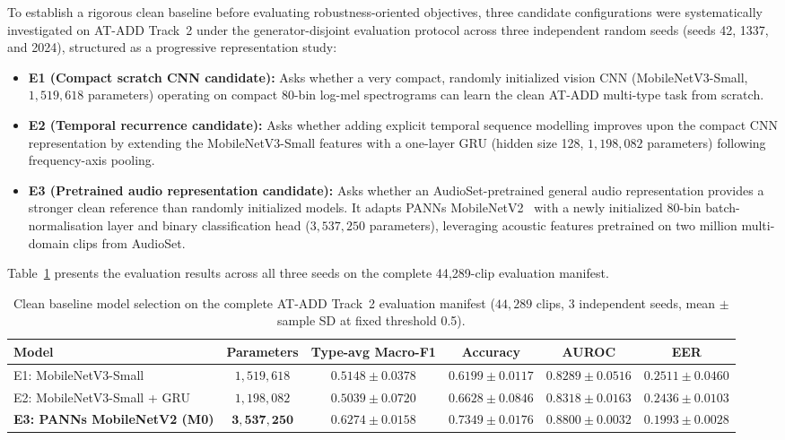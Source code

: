 To establish a rigorous clean baseline before evaluating robustness-oriented objectives, three candidate configurations were systematically investigated on AT-ADD Track~2 under the generator-disjoint evaluation protocol across three independent random seeds (seeds 42, 1337, and 2024), structured as a progressive representation study:
\begin{itemize}
  \item \textbf{E1 (Compact scratch CNN candidate):} Asks whether a very compact, randomly initialized vision CNN (MobileNetV3-Small, $1{,}519{,}618$ parameters) operating on compact 80-bin log-mel spectrograms can learn the clean AT-ADD multi-type task from scratch.
  \item \textbf{E2 (Temporal recurrence candidate):} Asks whether adding explicit temporal sequence modelling improves upon the compact CNN representation by extending the MobileNetV3-Small features with a one-layer GRU (hidden size 128, $1{,}198{,}082$ parameters) following frequency-axis pooling.
  \item \textbf{E3 (Pretrained audio representation candidate):} Asks whether an AudioSet-pretrained general audio representation provides a stronger clean reference than randomly initialized models. It adapts PANNs MobileNetV2~\cite{kong2020panns} with a newly initialized 80-bin batch-normalisation layer and binary classification head ($3{,}537{,}250$ parameters), leveraging acoustic features pretrained on two million multi-domain clips from AudioSet.
\end{itemize}

Table~\ref{tab:baseline-architecture-atadd} presents the evaluation results across all three seeds on the complete 44{,}289-clip evaluation manifest.

\begin{table}[htbp]
\centering
\caption{Clean baseline model selection on the complete AT-ADD Track~2 evaluation manifest ($44{,}289$ clips, 3 independent seeds, mean $\pm$ sample SD at fixed threshold 0.5).}
\label{tab:baseline-architecture-atadd}
\small
\begin{adjustbox}{max width=\textwidth}
\begin{tabular}{@{}lccccc@{}}
\toprule
Model & Parameters & Type-avg Macro-F1 & Accuracy & AUROC & EER \\
\midrule
E1: MobileNetV3-Small & $1{,}519{,}618$ & $0.5148 \pm 0.0378$ & $0.6199 \pm 0.0117$ & $0.8289 \pm 0.0516$ & $0.2511 \pm 0.0460$ \\
E2: MobileNetV3-Small + GRU & $1{,}198{,}082$ & $0.5039 \pm 0.0720$ & $0.6628 \pm 0.0846$ & $0.8318 \pm 0.0163$ & $0.2436 \pm 0.0103$ \\
\textbf{E3: PANNs MobileNetV2 (M0)} & $\mathbf{3{,}537{,}250}$ & $\mathbf{0.6274 \pm 0.0158}$ & $\mathbf{0.7349 \pm 0.0176}$ & $\mathbf{0.8800 \pm 0.0032}$ & $\mathbf{0.1993 \pm 0.0028}$ \\
\bottomrule
\end{tabular}
\end{adjustbox}
\end{table}

